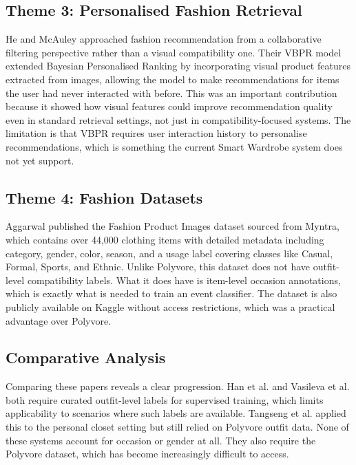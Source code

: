 \documentclass[conference]{IEEEtran}
\begin{document}
\subsection{Theme 3: Personalised Fashion Retrieval}

He and McAuley \cite{b5} approached fashion recommendation from a collaborative filtering perspective rather than a visual compatibility one. Their VBPR model extended Bayesian Personalised Ranking by incorporating visual product features extracted from images, allowing the model to make recommendations for items the user had never interacted with before. This was an important contribution because it showed how visual features could improve recommendation quality even in standard retrieval settings, not just in compatibility-focused systems. The limitation is that VBPR requires user interaction history to personalise recommendations, which is something the current Smart Wardrobe system does not yet support.

\subsection{Theme 4: Fashion Datasets}

Aggarwal \cite{b6} published the Fashion Product Images dataset sourced from Myntra, which contains over 44,000 clothing items with detailed metadata including category, gender, color, season, and a usage label covering classes like Casual, Formal, Sports, and Ethnic. Unlike Polyvore, this dataset does not have outfit-level compatibility labels. What it does have is item-level occasion annotations, which is exactly what is needed to train an event classifier. The dataset is also publicly available on Kaggle without access restrictions, which was a practical advantage over Polyvore.

\subsection{Comparative Analysis}

Comparing these papers reveals a clear progression. Han et al. and Vasileva et al. both require curated outfit-level labels for supervised training, which limits applicability to scenarios where such labels are available. Tangseng et al. applied this to the personal closet setting but still relied on Polyvore outfit data. None of these systems account for occasion or gender at all. They also require the Polyvore dataset, which has become increasingly difficult to access.
\end{document}
